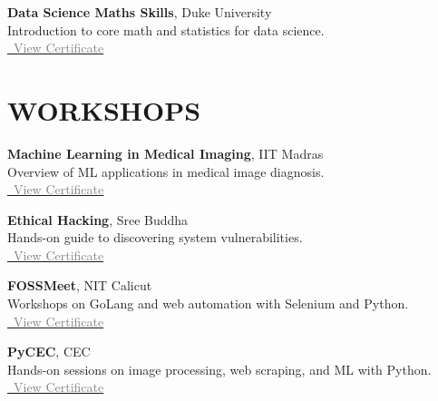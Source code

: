 \documentclass[11pt,a4paper]{article}
\begin{document}
\textbf{Data Science Maths Skills}, Duke University \\
Introduction to core math and statistics for data science. \\
\href{https://coursera.org/share/4bcf67532cd1ae69781e51db0bbb3445}{\faFilePdfO~\textcolor{gray}{View Certificate}}

\section*{WORKSHOPS}
\textbf{Machine Learning in Medical Imaging}, IIT Madras \\
Overview of ML applications in medical image diagnosis. \\
\href{https://jishnujp.github.io/certificates/mlmedic.jpg}{\faFilePdfO~\textcolor{gray}{View Certificate}}

\textbf{Ethical Hacking}, Sree Buddha \\
Hands-on guide to discovering system vulnerabilities. \\
\href{https://jishnujp.github.io/certificates/ethical_hacking.jpg}{\faFilePdfO~\textcolor{gray}{View Certificate}}

\textbf{FOSSMeet}, NIT Calicut \\
Workshops on GoLang and web automation with Selenium and Python. \\
\href{https://jishnujp.github.io/certificates/fossmeet.jpg}{\faFilePdfO~\textcolor{gray}{View Certificate}}

\textbf{PyCEC}, CEC \\
Hands-on sessions on image processing, web scraping, and ML with Python. \\
\href{https://jishnujp.github.io/certificates/pycec.jpg}{\faFilePdfO~\textcolor{gray}{View Certificate}}
\end{document}
